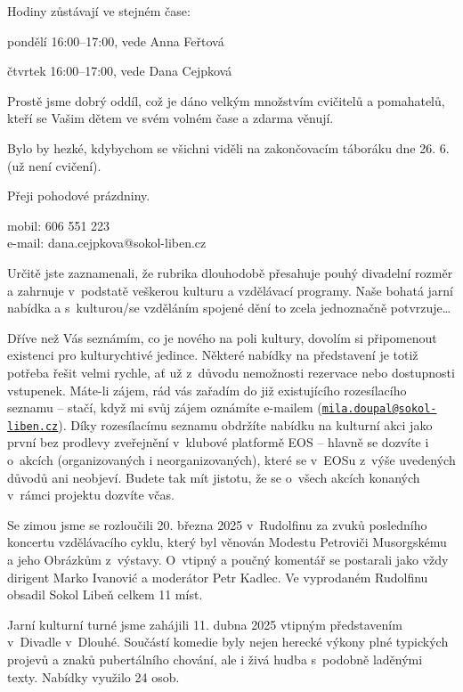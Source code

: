 \documentclass[11pt]{article}
\begin{document}
Hodiny zůstávají ve stejném čase:

pondělí 16:00--17:00, vede Anna Feřtová

čtvrtek 16:00--17:00, vede Dana Cejpková

Prostě jsme dobrý oddíl, což je dáno velkým množstvím cvičitelů a
pomahatelů, kteří se Vašim dětem ve svém volném čase a zdarma věnují.

Bylo by hezké, kdybychom se všichni viděli na zakončovacím táboráku dne
26. 6. (už není cvičení).

Přeji pohodové prázdniny.

\signature{Dana Cejpková}{mobil: 606 551 223\\e-mail: dana.cejpkova@sokol-liben.cz}

\vspace*{24pt}

Určitě jste zaznamenali, že rubrika 
dlouhodobě přesahuje pouhý divadelní rozměr a zahrnuje v~podstatě
veškerou kulturu a vzdělávací programy. Naše bohatá jarní nabídka a
s~kulturou/se vzděláním spojené dění to zcela jednoznačně
potvrzuje\ldots{}

Dříve než Vás seznámím, co je nového na poli
kultury, dovolím si připomenout existenci  pro
kulturychtivé jedince. Některé nabídky na představení je totiž potřeba
řešit velmi rychle, ať už z~důvodu nemožnosti rezervace nebo dostupnosti
vstupenek. Máte-li zájem, rád vás zařadím do již existujícího
rozesílacího seznamu -- stačí, když mi svůj zájem oznámíte e-mailem
(\href{mailto:mila.doupal@sokol-liben.cz}{\nolinkurl{mila.doupal@sokol-liben.cz}}).
Díky rozesílacímu seznamu obdržíte nabídku na kulturní akci jako první
bez prodlevy zveřejnění v~klubové platformě EOS -- hlavně se dozvíte i
o~akcích (organizovaných i neorganizovaných), které se v~EOSu z~výše
uvedených důvodů ani neobjeví. Budete tak mít jistotu, že se o~všech
akcích konaných v~rámci projektu  dozvíte včas.

Se zimou jsme se rozloučili 20. března 2025
v~Rudolfinu za zvuků posledního koncertu vzdělávacího cyklu, který byl
věnován Modestu Petroviči Musorgskému a jeho Obrázkům z~výstavy.
O~vtipný a poučný komentář se postarali jako vždy dirigent Marko Ivanović
a moderátor Petr Kadlec. Ve vyprodaném Rudolfinu obsadil Sokol Libeň
celkem 11 míst.

Jarní kulturní turné jsme zahájili 11. dubna 2025 vtipným představením
v~Divadle v~Dlouhé. Součástí komedie  byly nejen herecké výkony plné typických projevů a znaků
pubertálního chování, ale i živá hudba s~podobně laděnými texty. Nabídky
využilo 24 osob.
\end{document}
